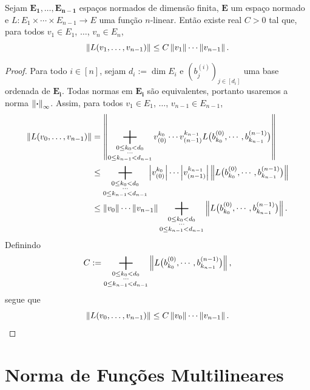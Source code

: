 \begin{prop}
Sejam $\bm{E_1},\dots,\bm{E_{n-1}}$ espaços normados de dimensão finita, $\bm{E}$ um espaço normado e $L\colon E_1 \times \cdots \times E_{n-1} \to E$ uma função $n$-linear. Então existe real $C > 0$ tal que, para todos $v_1 \in E_1$, $\ldots$, $v_n \in E_n$,
	\begin{equation*}
	\left\Vert{L(v_1,\ldots,v_{n-1})}\right\Vert \leq C\left\Vert{v_1}\right\Vert\cdots\left\Vert{v_{n-1}}\right\Vert.
	\end{equation*}
\end{prop}
\begin{proof}
Para todo $i \in [n]$, sejam $d_i := \dim E_i$ e $(b^{(i)}_j)_{j \in [d_i]}$ uma base ordenada de $\bm{E_i}$. Todas normas em $\bm{E_i}$ são equivalentes, portanto usaremos a norma $\left\Vert{\bm{\cdot}}\right\Vert_\infty$. Assim, para todos $v_1 \in E_1$, $\ldots$, $v_{n-1} \in E_{n-1}$,
	\begin{align*}
	\nor{L(v_0,\ldots,v_{n-1})} &= \nor{\sum_{\substack{0 \leq k_0 < d_0\\\cdots\\0\leq k_{n-1}< d_{n-1}}} v^{k_0}_{(0)} \cdots v^{k_{n-1}}_{(n-1)} L\big(b_{k_0}^{(0)},\cdots,b_{k_{n-1}}^{(n-1)}\big)} \\
		&\leq \sum_{\substack{0 \leq k_0 < d_0\\\cdots\\0\leq k_{n-1}< d_{n-1}}} \abs{v^{k_0}_{(0)}}\cdots\abs{v^{k_{n-1}}_{(n-1)}}\nor{L\big(b_{k_0}^{(0)},\cdots,b_{k_{n-1}}^{(n-1)}\big)} \\
		&\leq \nor{v_0}\cdots\nor{v_{n-1}}\sum_{\substack{0 \leq k_0 < d_0\\\cdots\\0\leq k_{n-1}< d_{n-1}}} \nor{L\big(b_{k_0}^{(0)},\cdots,b_{k_{n-1}}^{(n-1)}\big)}.
	\end{align*}
Definindo
	\begin{equation*}
	C := \sum_{\substack{0 \leq k_0 < d_0\\\cdots\\0\leq k_{n-1}< d_{n-1}}} \nor{L\big(b_{k_0}^{(0)},\cdots,b_{k_{n-1}}^{(n-1)}\big)},
	\end{equation*}
segue que
	\begin{equation*}
	\left\Vert{L(v_0,\ldots,v_{n-1})}\right\Vert \leq C \left\Vert{v_0}\right\Vert\cdots\left\Vert{v_{n-1}}\right\Vert.
	\end{equation*}
\end{proof}





\section{Norma de Funções Multilineares}














